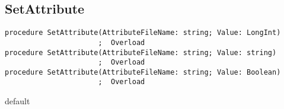 \subsection{SetAttribute}
\label{computer:sysfs:setattribute}
\begin{FPCList}
\Declaration 

\begin{verbatim}
procedure SetAttribute(AttributeFileName: string; Value: LongInt)
                      ;  Overload
procedure SetAttribute(AttributeFileName: string; Value: string)
                      ;  Overload
procedure SetAttribute(AttributeFileName: string; Value: Boolean)
                      ;  Overload
\end{verbatim}
\Visibility
default
\end{FPCList}
